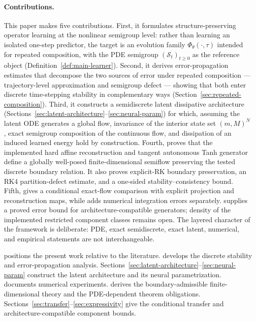 \documentclass[hidelinks,review,nohypdvips,onefignum,onetabnum]{siamart220329}
\newcommand{\cS}{\mathcal{S}}
\begin{document}
\paragraph{Contributions.}
This paper makes five contributions.
First, it formulates structure-preserving operator learning at the nonlinear semigroup level: rather than learning an isolated one-step predictor, the target is an evolution family \(\Phi_{\theta}(\cdot,\tau)\) intended for repeated composition, with the PDE semigroup \((\cS_t)_{t\ge 0}\) as the reference object (Definition~\ref{def:main-learner}).
Second, it derives error-propagation estimates that decompose the two sources of error under repeated composition — trajectory-level approximation and semigroup defect — showing that both enter discrete time-stepping stability in complementary ways (Section~\ref{sec:repeated-composition}).
Third, it constructs a semidiscrete latent dissipative architecture (Sections~\ref{sec:latent-architecture}--\ref{sec:neural-param}) for which, assuming the latent ODE generates a global flow, invariance of the interior state set $(m,M)^N$, exact semigroup composition of the continuous flow, and dissipation of an induced learned energy hold by construction.
Fourth,  proves that the implemented hard affine reconstruction and tangent autonomous Tanh generator define a globally well-posed finite-dimensional semiflow preserving the tested discrete boundary relation.  It also proves explicit-RK boundary preservation, an RK4 partition-defect estimate, and a one-sided stability--consistency bound.
Fifth,  gives a conditional exact-flow comparison with explicit projection and reconstruction maps, while  adds numerical integration errors separately.  supplies a proved error bound for architecture-compatible generators; density of the implemented restricted component classes remains open.
The layered character of the framework is deliberate: PDE, exact semidiscrete, exact latent, numerical, and empirical statements are not interchangeable.

 positions the present work relative to the literature.  develops the discrete stability and error-propagation analysis. Sections~\ref{sec:latent-architecture}--\ref{sec:neural-param} construct the latent architecture and its neural parametrization.  documents numerical experiments.  derives the boundary-admissible finite-dimensional theory and the PDE-dependent theorem obligations. Sections~\ref{sec:transfer}--\ref{sec:expressivity} give the conditional transfer and architecture-compatible component bounds.
\end{document}
